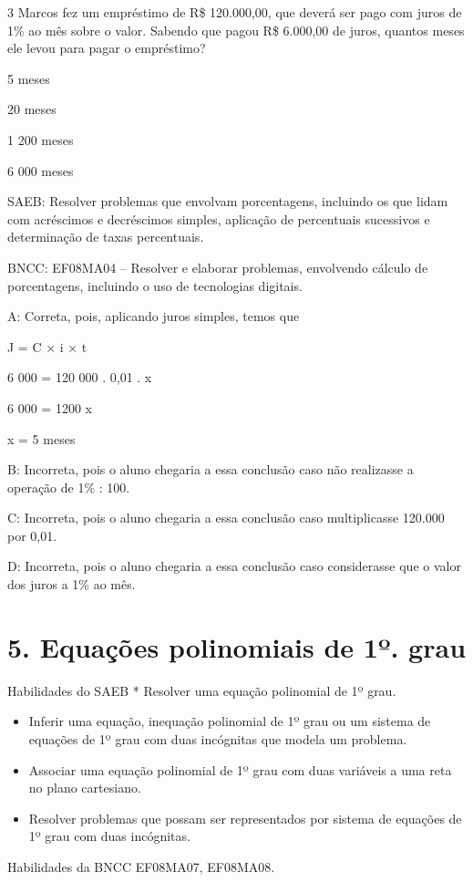 {\num{3} Marcos fez um empréstimo de R\$ 120.000,00, que deverá ser pago com
juros de 1\% ao mês sobre o valor. Sabendo que pagou R\$ 6.000,00 de
juros, quantos meses ele levou para pagar o empréstimo?
\item 5 meses
\item 20 meses
\item 1 200 meses
\item 6 000 meses

SAEB: Resolver problemas que envolvam porcentagens, incluindo os que
lidam com acréscimos e decréscimos simples, aplicação de percentuais
sucessivos e determinação de taxas percentuais.

BNCC: EF08MA04 -- Resolver e elaborar problemas, envolvendo cálculo de
porcentagens, incluindo o uso de tecnologias digitais.

A: Correta, pois, aplicando juros simples, temos que

J = C × i × t

6 000 = 120 000 . 0,01 . x

6 000 = 1200 x

x = 5 meses

B: Incorreta, pois o aluno chegaria a essa conclusão caso não realizasse
a operação de 1\% : 100.

C: Incorreta, pois o aluno chegaria a essa conclusão caso multiplicasse
120.000 por 0,01.

D: Incorreta, pois o aluno chegaria a essa conclusão caso considerasse
que o valor dos juros a 1\% ao mês.


\section{5. Equações polinomiais de 1º.
grau}

Habilidades do SAEB * Resolver uma equação polinomial de 1º grau.

\begin{itemize}
\item
  Inferir uma equação, inequação polinomial de 1º grau ou um sistema de
  equações de 1º grau com duas incógnitas que modela um problema.
\item
  Associar uma equação polinomial de 1º grau com duas variáveis a uma
  reta no plano cartesiano.
\item
  Resolver problemas que possam ser representados por sistema de
  equações de 1º grau com duas incógnitas.
\end{itemize}

Habilidades da BNCC EF08MA07, EF08MA08.

}
